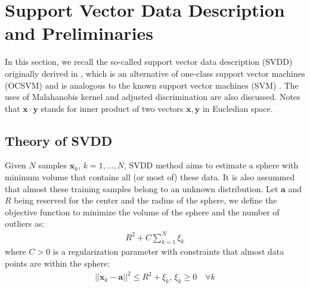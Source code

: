 \documentclass[conference]{IEEEtran}
\theoremstyle{problemstyle}
\begin{document}
\section{Support Vector Data Description and Preliminaries}
\label{sec:SVDD}
In this section, we recall the so-called support vector data description (SVDD) originally derived in \cite{Tax2004}, which is an alternative of one-class support vector machines (OCSVM) \cite{scholkopf2001estimating} and is analogous to the known support vector machines (SVM) \cite{Vapnik1998}. The uses of Malahanobis kernel and adjusted discrimination are also discussed. Notes that $\mathbf{x} \cdot \mathbf{y}$ stands for inner product of two vectors  $\mathbf{x},\mathbf{y}$ in Eucledian space.

\subsection{Theory of SVDD}

Given $N$ samples $\mathbf{x}_k$, $k=1,\dots,N$, SVDD method aims to estimate a sphere with minimum volume that contains all (or most of) these data. It is also assummed that almost these training samples belong to an unknown distribution. Let $\mathbf{a}$ and $R$ being reserved for the center and the radius of the sphere, we define the objective function to minimize the volume of the sphere and the number of outliers as:
\begin{align}
R^2 + C \sum_{k=1}^N \xi_k
\end{align}
where $C > 0$ is a regularization parameter with constraints that almost data points are within the sphere:
\begin{align}
\left|\left| \mathbf{x}_k - \mathbf{a} \right|\right|^2 \le R^2 + \xi_k \text{, } \xi_k \ge 0 \quad \forall k
\end{align}
\end{document}
